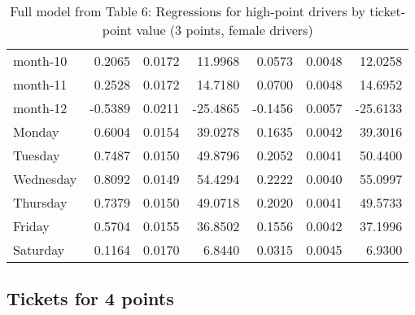 \documentclass[10pt]{article}
\begin{document}
\begin{table}[ht]
\begin{tabular}{lrrrrrr}
  month-10 & 0.2065 & 0.0172 & 11.9968 & 0.0573 & 0.0048 & 12.0258 \\ 
  month-11 & 0.2528 & 0.0172 & 14.7180 & 0.0700 & 0.0048 & 14.6952 \\ 
  month-12 & -0.5389 & 0.0211 & -25.4865 & -0.1456 & 0.0057 & -25.6133 \\ 
  Monday & 0.6004 & 0.0154 & 39.0278 & 0.1635 & 0.0042 & 39.3016 \\ 
  Tuesday & 0.7487 & 0.0150 & 49.8796 & 0.2052 & 0.0041 & 50.4400 \\ 
  Wednesday & 0.8092 & 0.0149 & 54.4294 & 0.2222 & 0.0040 & 55.0997 \\ 
  Thursday & 0.7379 & 0.0150 & 49.0718 & 0.2020 & 0.0041 & 49.5733 \\ 
  Friday & 0.5704 & 0.0155 & 36.8502 & 0.1556 & 0.0042 & 37.1996 \\ 
  Saturday & 0.1164 & 0.0170 & 6.8440 & 0.0315 & 0.0045 & 6.9300 \\ 
   \hline
\end{tabular}
\caption{Full model from Table 6: Regressions for high-point drivers by ticket-point value (3 points, female drivers)} 
\label{tab_6_3_pts_no_age_F}
\end{table}


\clearpage
\pagebreak




\subsection{Tickets for 4 points}



\end{document}
